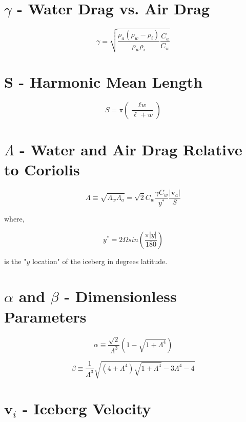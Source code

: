 \documentclass[12pt]{article}
\begin{document}
\section{$\gamma$ - Water Drag vs. Air Drag}

\begin{equation}
\gamma = \sqrt{\dfrac{\rho_a(\rho_w - \rho_i)}{\rho_w\rho_i}\dfrac{C_a}{C_w}}
\end{equation}

\section{S - Harmonic Mean Length}

\begin{equation}
S = \pi(\dfrac{\ell\textit{w}}{\ell+\textit{w}})
\end{equation}

\section{$\Lambda$ - Water and Air Drag Relative to Coriolis}

\begin{equation}
\Lambda \equiv \sqrt{\Lambda_w\Lambda_a} = 
\sqrt{2}C_w\dfrac{\gamma C_w}{y^*}\dfrac{|\textbf{v}_a|}{S}
\end{equation}

where,

\begin{equation}
y^* = 2 \Omega sin(\dfrac{\pi |y|}{180})
\end{equation}

is the "$y$ location" of the iceberg in degrees latitude.

\section{$\alpha$ and $\beta$ - Dimensionless Parameters}

\begin{equation}
\alpha \equiv \dfrac{\sqrt{2}}{\Lambda^3}(1-\sqrt{1+\Lambda^4})
\end{equation}

\begin{equation}
\beta \equiv \dfrac{1}{\Lambda^3}\sqrt{(4+\Lambda^4)\sqrt{1+\Lambda^4}
             - 3\Lambda^4 - 4}
\end{equation}

\section{$\textbf{v}_i$ - Iceberg Velocity}
\end{document}
